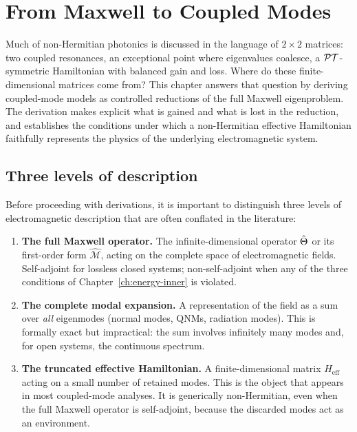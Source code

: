 \chapter{From Maxwell to Coupled Modes}
\label{ch:maxwell-coupled-modes}

\begin{chapterlead}
Much of non-Hermitian photonics is discussed in the language of $2\times 2$
matrices: two coupled resonances, an exceptional point where eigenvalues
coalesce, a $\mathcal{PT}$-symmetric Hamiltonian with balanced gain and loss.
Where do these finite-dimensional matrices come from? This chapter
answers that question by deriving coupled-mode models as controlled
reductions of the full Maxwell eigenproblem. The derivation makes
explicit what is gained and what is lost in the reduction, and establishes
the conditions under which a non-Hermitian effective Hamiltonian
faithfully represents the physics of the underlying electromagnetic system.
\end{chapterlead}


\section{Three levels of description}
\label{sec:three-levels}

Before proceeding with derivations, it is important to distinguish three
levels of electromagnetic description that are often conflated in the
literature:

\begin{enumerate}
 \item \textbf{The full Maxwell operator.} The infinite-dimensional
 operator $\hat{\Theta}$ or its first-order form $\hat{\mathcal{M}}$, acting
 on the complete space of electromagnetic fields. Self-adjoint for
 lossless closed systems; non-self-adjoint when any of the three
 conditions of Chapter~\ref{ch:energy-inner} is violated.

 \item \textbf{The complete modal expansion.} A representation of the
 field as a sum over \emph{all} eigenmodes (normal modes, QNMs,
 radiation modes). This is formally exact but impractical: the sum
 involves infinitely many modes and, for open systems, the continuous
 spectrum.

 \item \textbf{The truncated effective Hamiltonian.} A finite-dimensional
 matrix $H_{\mathrm{eff}}$ acting on a small number of retained modes.
 This is the object that appears in most coupled-mode analyses.
 It is generically non-Hermitian, even when the full Maxwell operator
 is self-adjoint, because the discarded modes act as an environment.
\end{enumerate}

